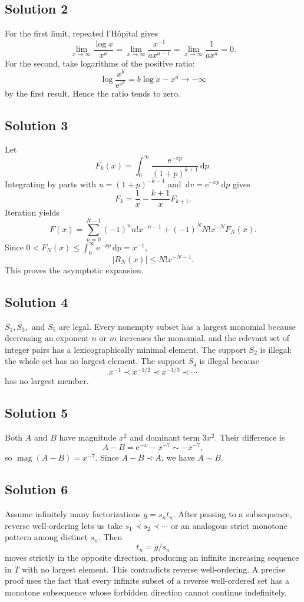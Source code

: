 \documentclass[11pt,openany]{book}
\theoremstyle{plain}
\theoremstyle{definition}
\theoremstyle{remark}
\newcommand{\magop}{\operatorname{mag}}
\newcommand{\dd}{\,\mathrm{d}}
\newcommand{\e}{\mathrm{e}}
\begin{document}
\subsection*{Solution 2}
For the first limit, repeated l'H\^opital gives
\[
  \lim_{x\to\infty}\frac{\log x}{x^a}
  =\lim_{x\to\infty}\frac{x^{-1}}{ax^{a-1}}
  =\lim_{x\to\infty}\frac1{ax^a}=0.
\]
For the second, take logarithms of the positive ratio:
\[
  \log\frac{x^b}{\e^{x^a}}=b\log x-x^a\to-\infty
\]
by the first result. Hence the ratio tends to zero.

\subsection*{Solution 3}
Let
\[
  F_k(x)=\int_0^\infty\frac{\e^{-xp}}{(1+p)^{k+1}}\dd p.
\]
Integrating by parts with $u=(1+p)^{-k-1}$ and
$\dd v=\e^{-xp}\dd p$ gives
\[
  F_k=\frac1x-\frac{k+1}{x}F_{k+1}.
\]
Iteration yields
\[
 F(x)=\sum_{n=0}^{N-1}(-1)^nn!x^{-n-1}
 +(-1)^N N!x^{-N}F_N(x).
\]
Since $0<F_N(x)\le\int_0^\infty\e^{-xp}\dd p=x^{-1}$,
\[
 |R_N(x)|\le N!x^{-N-1}.
\]
This proves the asymptotic expansion.

\subsection*{Solution 4}
$S_1,S_3,$ and $S_5$ are legal. Every nonempty subset has a largest monomial because decreasing an exponent $n$ or $m$ increases the monomial, and the relevant set of integer pairs has a lexicographically minimal element. The support $S_2$ is illegal: the whole set has no largest element. The support $S_4$ is illegal because
\[
 x^{-1}\prec x^{-1/2}\prec x^{-1/3}\prec\cdots
\]
has no largest member.

\subsection*{Solution 5}
Both $A$ and $B$ have magnitude $x^2$ and dominant term $3x^2$. Their difference is
\[
  A-B=\e^{-x}-x^{-7}\sim-x^{-7},
\]
so $\magop(A-B)=x^{-7}$. Since $A-B\prec A$, we have $A\sim B$.

\subsection*{Solution 6}
Assume infinitely many factorizations $g=s_nt_n$. After passing to a subsequence, reverse well-ordering lets us take $s_1\prec s_2\prec\cdots$ or an analogous strict monotone pattern among distinct $s_n$. Then
\[
  t_n=g/s_n
\]
moves strictly in the opposite direction, producing an infinite increasing sequence in $T$ with no largest element. This contradicts reverse well-ordering. A precise proof uses the fact that every infinite subset of a reverse well-ordered set has a monotone subsequence whose forbidden direction cannot continue indefinitely.
\end{document}
